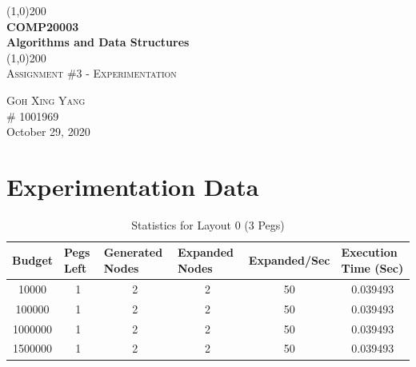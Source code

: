 \documentclass[12pt,a4paper]{article}
\begin{document}
\begin{titlepage}
	\begin{center}
	\line(1,0){200}\\
	[0.25in]
	\huge{\bfseries COMP20003 \\Algorithms and Data Structures}\\
	[2mm]
	\line(1,0){200}\\
	[1.5cm]
	\textsc{\LARGE Assignment \#3 - Experimentation}\\
	[17.5cm]
	\end{center}

	\begin{flushright}	
	\textsc{ Goh Xing Yang\\}
	\# 1001969\\
	
	October 29, 2020\\
	\end{flushright}
\end{titlepage}

\setcounter{page}{1}




\section{Experimentation Data}
\begin{table}[H]
\caption{Statistics for Layout 0 (3 Pegs)}
\label{tab:my-table}

\begin{tabular}{|c|c|c|c|c|c|}
\hline
Budget  & \multicolumn{1}{l|}{Pegs Left} & \multicolumn{1}{l|}{Generated Nodes} & \multicolumn{1}{l|}{Expanded Nodes} & \multicolumn{1}{l|}{Expanded/Sec} & \multicolumn{1}{l|}{Execution   Time (Sec)} \\ \hline
10000   & 1                              & 2                                    & 2                                   & 50                                   & 0.039493                                              \\ \hline
100000  & 1                              & 2                                    & 2                                   & 50                                   & 0.039493                                              \\ \hline
1000000 & 1                              & 2                                    & 2                                   & 50                                   & 0.039493                                              \\ \hline
1500000 & 1                              & 2                                    & 2                                   & 50                                   & 0.039493                                              \\ \hline
\end{tabular}
\end{table}
\end{document}
